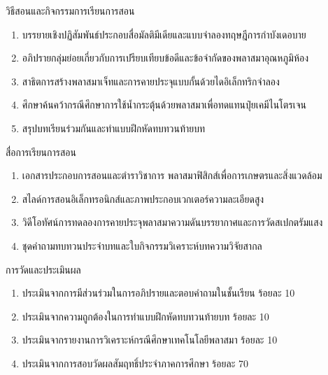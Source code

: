 \begin{planbox}{วิธีสอนและกิจกรรมการเรียนการสอน}
\begin{enumerate}
    \item บรรยายเชิงปฏิสัมพันธ์ประกอบสื่อมัลติมีเดียและแบบจำลองทฤษฎีการกำบังเดอบาย
    \item อภิปรายกลุ่มย่อยเกี่ยวกับการเปรียบเทียบข้อดีและข้อจำกัดของพลาสมาอุณหภูมิห้อง
    \item สาธิตการสร้างพลาสมาเจ็ทและการคายประจุแบบกั้นด้วยไดอิเล็กทริกจำลอง
    \item ศึกษาค้นคว้ากรณีศึกษาการใช้น้ำกระตุ้นด้วยพลาสมาเพื่อทดแทนปุ๋ยเคมีไนโตรเจน
    \item สรุปบทเรียนร่วมกันและทำแบบฝึกหัดทบทวนท้ายบท
\end{enumerate}
\end{planbox}

\begin{planbox}{สื่อการเรียนการสอน}
\begin{enumerate}
    \item เอกสารประกอบการสอนและตำราวิชาการ พลาสมาฟิสิกส์เพื่อการเกษตรและสิ่งแวดล้อม
    \item สไลด์การสอนอิเล็กทรอนิกส์และภาพประกอบเวกเตอร์ความละเอียดสูง
    \item วิดีโอทัศน์การทดลองการคายประจุพลาสมาความดันบรรยากาศและการวัดสเปกตรัมแสง
    \item ชุดคำถามทบทวนประจำบทและใบกิจกรรมวิเคราะห์บทความวิจัยสากล
\end{enumerate}
\end{planbox}

\begin{planbox}{การวัดและประเมินผล}
\begin{enumerate}
    \item ประเมินจากการมีส่วนร่วมในการอภิปรายและตอบคำถามในชั้นเรียน ร้อยละ 10
    \item ประเมินจากความถูกต้องในการทำแบบฝึกหัดทบทวนท้ายบท ร้อยละ 10
    \item ประเมินจากรายงานการวิเคราะห์กรณีศึกษาเทคโนโลยีพลาสมา ร้อยละ 10
    \item ประเมินจากการสอบวัดผลสัมฤทธิ์ประจำภาคการศึกษา ร้อยละ 70
\end{enumerate}
\end{planbox}

\clearpage


